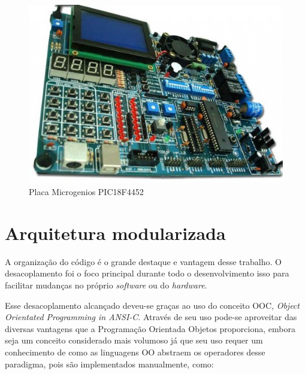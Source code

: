  \newpage
 
 \begin{figure}[htp]
 	\centering
 	\includegraphics[scale=1]{images/pic_microgenio.png}
 	\caption{Placa Microgenios PIC18F4452}	
 	\label{fig:microgenios}
 \end{figure}

\section{Arquitetura modularizada}

A organização do código é o grande destaque e vantagem desse trabalho. O desacoplamento foi o foco principal durante todo o desenvolvimento isso para facilitar mudanças no próprio \emph{software} ou do \emph{hardware}.

Esse desacoplamento alcançado deveu-se graças ao uso do conceito OOC, \emph{Object Orientated Programming in ANSI-C}. Através de seu uso pode-se aproveitar das diversas vantagens que a Programação Orientada Objetos proporciona, embora seja um conceito considerado mais volumoso já que seu uso requer um conhecimento de como as linguagens OO abstraem os operadores desse paradigma, pois são implementados manualmente, como:

